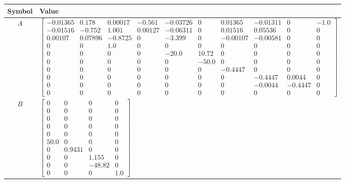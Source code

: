 \begin{tabular}{cl}
\hline
  Symbol  & Value                                                                                                                                                                                                                                                                                                                                                                                                                                                                                                                                                                                                               \\
\hline
   $A$    & $\left[\begin{matrix}-0.01365 & 0.178 & 0.00017 & -0.561 & -0.03726 & 0 & 0.01365 & -0.01311 & 0 & -1.0\\-0.01516 & -0.752 & 1.001 & 0.00127 & -0.06311 & 0 & 0.01516 & 0.05536 & 0 & 0\\0.00107 & 0.07896 & -0.8725 & 0 & -3.399 & 0 & -0.00107 & -0.00581 & 0 & 0\\0 & 0 & 1.0 & 0 & 0 & 0 & 0 & 0 & 0 & 0\\0 & 0 & 0 & 0 & -20.0 & 10.72 & 0 & 0 & 0 & 0\\0 & 0 & 0 & 0 & 0 & -50.0 & 0 & 0 & 0 & 0\\0 & 0 & 0 & 0 & 0 & 0 & -0.4447 & 0 & 0 & 0\\0 & 0 & 0 & 0 & 0 & 0 & 0 & -0.4447 & 0.0044 & 0\\0 & 0 & 0 & 0 & 0 & 0 & 0 & -0.0044 & -0.4447 & 0\\0 & 0 & 0 & 0 & 0 & 0 & 0 & 0 & 0 & 0\end{matrix}\right]$ \\
   $B$    & $\left[\begin{matrix}0 & 0 & 0 & 0\\0 & 0 & 0 & 0\\0 & 0 & 0 & 0\\0 & 0 & 0 & 0\\0 & 0 & 0 & 0\\50.0 & 0 & 0 & 0\\0 & 0.9431 & 0 & 0\\0 & 0 & 1.155 & 0\\0 & 0 & -48.82 & 0\\0 & 0 & 0 & 1.0\end{matrix}\right]$                                                                                                                                                                                                                                                                                                                                                                                                    \\

\end{tabular}
